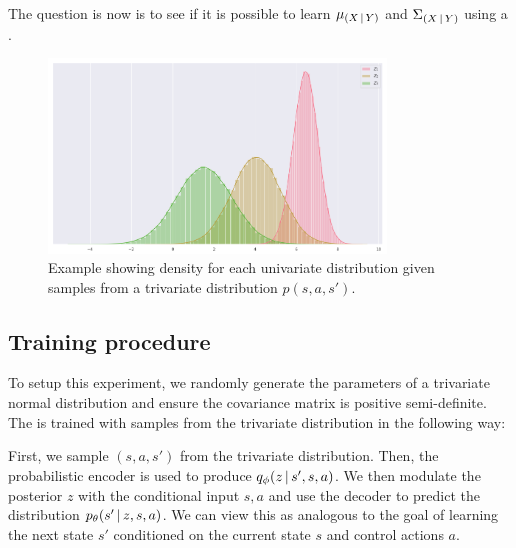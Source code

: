 The question is now is to see if it is possible to learn $\mu_{\given{X}{Y}}$ and $\Sigma_{\given{X}{Y}}$ using a \cvae{}.

\begin{figure}
\begin{center}
\includegraphics[width=0.8\textwidth]{img/trivariate}
\caption{Example showing density for each univariate distribution given samples from a trivariate distribution $p(s, a, s')$.}
\end{center}
\end{figure}

\subsection{Training procedure}

To setup this experiment, we randomly generate the parameters of a trivariate normal distribution and ensure the covariance matrix is positive semi-definite. The \cvae{} is trained with samples from the trivariate distribution in the following way:

First, we sample $(s, a, s')$ from the trivariate distribution. Then, the probabilistic encoder is used to produce $\qphi \given{z}{s', s, a}$. We then modulate the posterior $z$ with the conditional input $s, a$ and use the decoder to predict the distribution $\ptheta \given{s'}{z, s, a}$. We can view this as analogous to the goal of learning the next state $s'$ conditioned on the current state $s$ and control actions $a$.

